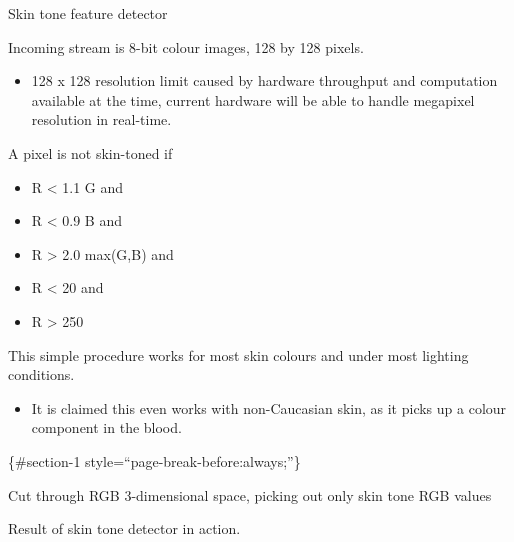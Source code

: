 \documentclass[compress]{beamer}
\providecommand{\tightlist}{%
  \setlength{\itemsep}{0pt}\setlength{\parskip}{0pt}}
\begin{document}
\begin{frame}{Skin tone feature detector}

Incoming stream is 8-bit colour images, 128 by 128 pixels.

\begin{itemize}
\tightlist
\item
  128 x 128 resolution limit caused by hardware throughput and
  computation available at the time, current hardware will be able to
  handle megapixel resolution in real-time.
\end{itemize}

A pixel is not skin-toned if

\begin{itemize}
\tightlist
\item
  R \textless{} 1.1 G and
\item
  R \textless{} 0.9 B and
\item
  R \textgreater{} 2.0 max(G,B) and
\item
  R \textless{} 20 and
\item
  R \textgreater{} 250
\end{itemize}

This simple procedure works for most skin colours and under most
lighting conditions.

\begin{itemize}
\tightlist
\item
  It is claimed this even works with non-Caucasian skin, as it picks up
  a colour component in the blood.
\end{itemize}

\{\#section-1 style=``page-break-before:always;''\}

Cut through RGB 3-dimensional space, picking out only skin tone RGB
values

Result of skin tone detector in action.

\end{frame}
\end{document}
